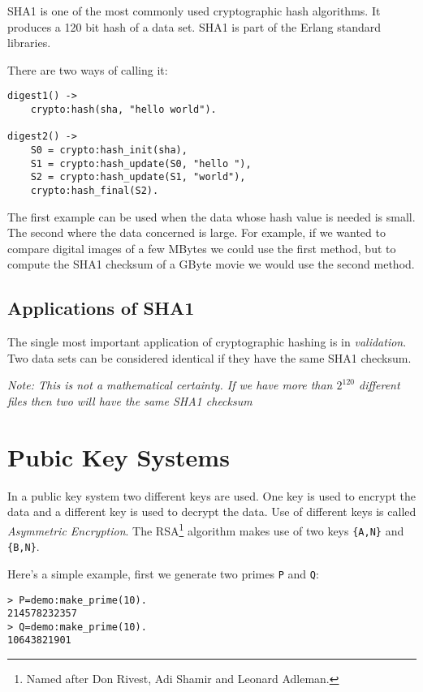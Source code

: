 \documentclass[12pt]{article}
\begin{document}
SHA1 is one of the most commonly used cryptographic hash algorithms.
It produces a 120 bit hash of a data set.
SHA1 is part of the Erlang standard libraries.

There are two ways of calling it:

\begin{Verbatim}[frame=single]
digest1() ->
    crypto:hash(sha, "hello world").

digest2() ->
    S0 = crypto:hash_init(sha),
    S1 = crypto:hash_update(S0, "hello "),
    S2 = crypto:hash_update(S1, "world"),
    crypto:hash_final(S2).
\end{Verbatim}

The first example can be used when the data whose hash value is needed
is small.  The second where the data concerned is large. For example, if
we wanted to compare digital images of a few MBytes we could use
the first method, but to compute the SHA1 checksum of a GByte movie we
would use the second method.

\subsection{Applications of SHA1}

The single most important application of cryptographic hashing is in {\sl
  validation}. Two data sets can be considered identical if they have
the same SHA1 checksum.

{\sl Note: This is not a mathematical certainty. If we have more than $2^{120}$
  different files then two will have the same SHA1 checksum}

\section{Pubic Key Systems}

In a public key system two different keys are used. One key is used to
encrypt the data and a different key is used to decrypt the data.
Use of different keys is called {\sl Asymmetric Encryption}.
The RSA\footnote{Named after Don Rivest, Adi Shamir and Leonard Adleman.}  
algorithm makes use of two keys \verb+{A,N}+ and
\verb+{B,N}+.

Here's a simple example, first we generate two primes \verb+P+ and \verb+Q+:

\begin{verbatim}
> P=demo:make_prime(10).
214578232357
> Q=demo:make_prime(10).
10643821901
\end{verbatim}
\end{document}
